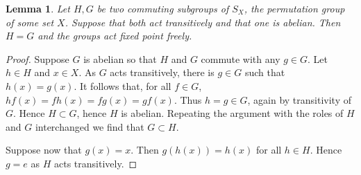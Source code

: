 \documentclass[10pt,a4paper]{amsart}
\newtheorem{lemma}[theorem]{Lemma}
\numberwithin{equation}{section}
\begin{document}
\begin{lemma}\label{lem-ls}
Let $H,G$ be two commuting subgroups of $S_X$, the permutation group of some set $X$. Suppose that both act transitively and that one is abelian. Then $H=G$ and the groups act fixed point freely.
\end{lemma}
\begin{proof}
Suppose $G$ is abelian so that $H$ and $G$ commute with any $g\in G$. Let $h\in H$ and $x\in X$. As $G$ acts transitively, there is $g\in G$ such that $h(x) = g(x)$. It follows that, for all $f\in G$,
$hf(x)=fh(x) = fg(x) =gf(x)$. Thus $h=g\in G$, again by transitivity of $G$. 
Hence $H\subset G$, hence $H$ is abelian. Repeating the argument with the roles of $H$ and $G$ interchanged we find that $G\subset H$. 

Suppose now that $g(x)=x$. Then $g(h(x))=h(x)$ for all $h\in H$. Hence $g=e$ as $H$ acts transitively. 
\end{proof}


\end{document}
